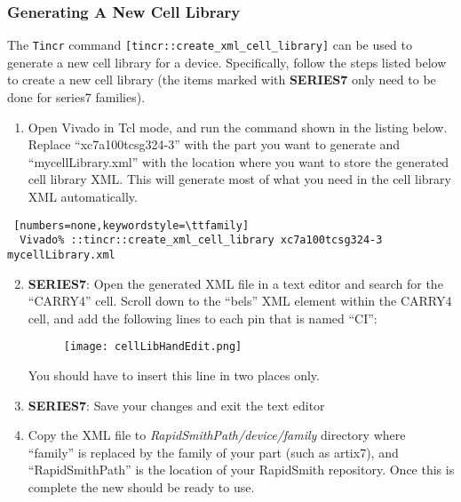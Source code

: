 \subsubsection{Generating A New Cell Library} \label{sec:cellLibraryGeneration}
The \texttt{Tincr} command \texttt{[tincr::create\_xml\_cell\_library]} can be
used to generate a new cell library for a device. Specifically, follow the steps
listed below to create a new cell library (the items marked with
\textbf{SERIES7} only need to be done for series7 families).

\begin{enumerate}
  \item Open Vivado in Tcl mode, and run the command shown in the listing below.
  Replace ``xc7a100tcsg324-3'' with the part you want to generate and
  ``mycellLibrary.xml'' with the location where you want to store the generated
  cell library XML. This will generate most of what you need in the cell
  library XML automatically.
\end{enumerate}

  \begin{lstlisting} [numbers=none,keywordstyle=\ttfamily]
  Vivado% ::tincr::create_xml_cell_library xc7a100tcsg324-3 mycellLibrary.xml
  \end{lstlisting}

\begin{enumerate}
 \setcounter{enumi}{1} 
  \item \textbf{SERIES7}: Open the generated XML file in a text editor and
  search for the ``CARRY4'' cell. Scroll down to the ``bels'' XML element within
  the CARRY4 cell, and add the following lines to each pin that is named ``CI'':
  
  \begin{figure}[H]
   \centering
   \texttt{[image: cellLibHandEdit.png]}
  \end{figure}
  
  You should have to insert this line in two places only.
  \item \textbf{SERIES7}: Save your changes and exit the text editor
  \item Copy the XML file to \textit{RapidSmithPath/device/family}
  directory where ``family'' is replaced by the family of your part (such as
  artix7), and ``RapidSmithPath'' is the location of your RapidSmith repository.
  Once this is complete the new  should be ready to use. 
\end{enumerate}

